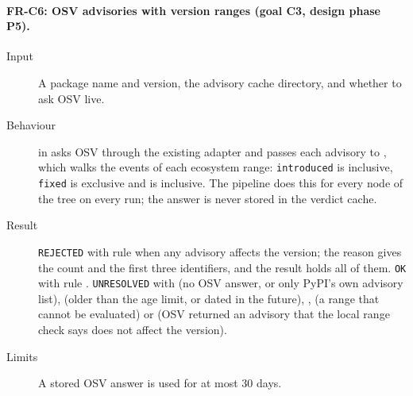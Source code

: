 \paragraph{FR-C6: OSV advisories with version ranges (goal C3, design phase P5).}
\begin{sloppypar}
\begin{description}
    \item[Input] A package name and version, the advisory cache directory, and whether to ask OSV live.
    \item[Behaviour]  in  asks OSV through the existing adapter and passes each advisory to , which walks the events of each ecosystem range: \texttt{introduced} is inclusive, \texttt{fixed} is exclusive and  is inclusive. The pipeline does this for every node of the tree on every run; the answer is never stored in the verdict cache.
    \item[Result] \texttt{REJECTED} with rule  when any advisory affects the version; the reason gives the count and the first three identifiers, and the result holds all of them. \texttt{OK} with rule . \texttt{UNRESOLVED} with  (no OSV answer, or only PyPI's own advisory list),  (older than the age limit, or dated in the future), ,  (a range that cannot be evaluated) or  (OSV returned an advisory that the local range check says does not affect the version).
    \item[Limits] A stored OSV answer is used for at most 30 days.
\end{description}
\end{sloppypar}

